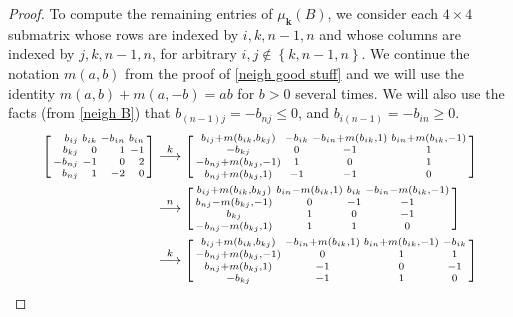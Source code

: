 \documentclass{amsart}
\theoremstyle{definition}
\theoremstyle{remark}
\numberwithin{equation}{section}
\newcommand{\sgn}{\operatorname{sgn}}
\newcommand{\set}[1]{{\left\lbrace #1 \right\rbrace}}
\newcommand{\0}{{\mathbf{0}}}
\newcommand{\kk}{\mathbf{k}}
\begin{document}
\begin{proof}
To compute the remaining entries of $\mu_\kk(B)$, we consider each $4\times4$ submatrix whose rows are indexed by $i,k,n-1,n$ and whose columns are indexed by $j,k,n-1,n$, for arbitrary $i,j\not\in\set{k,n-1,n}$.
We continue the notation $m(a,b)$ from the proof of \cref{neigh good stuff} and we will use the identity $m(a,b)+m(a,-b)=ab$ for $b>0$ several times.
We will also use the facts (from \cref{neigh B}) that $b_{(n-1)j}=-b_{nj}\le0$, and $b_{i(n-1)}=-b_{in}\ge0$.
\begin{align*}
\begin{bsmallmatrix*}[r]
b_{ij}&b_{ik}&-b_{in}&b_{in}\\
b_{kj}&0&1&-1\\
-b_{nj}&-1&0&2\\
b_{nj}&1&-2&0
\end{bsmallmatrix*}
&\overset{k}{\longrightarrow}
\begin{bsmallmatrix*}
b_{ij}+m(b_{ik},b_{kj}) & -b_{ik} & -b_{in}+m(b_{ik},1) & b_{in}+m(b_{ik},-1)\\
-b_{kj} & 0 & -1 & 1\\
-b_{nj}+m(b_{kj},-1) & 1 & 0 & 1\\
b_{nj}+m(b_{kj},1) & -1 & -1 & 0
\end{bsmallmatrix*}\\
&\overset{n}{\longrightarrow}
\begin{bsmallmatrix*}
b_{ij}+m(b_{ik},b_{kj}) & b_{in}-m(b_{ik},1) & b_{ik} & -b_{in}-m(b_{ik},-1)\\
b_{nj}-m(b_{kj},-1) & 0 & -1 & -1\\
b_{kj} & 1 & 0 & -1\\
-b_{nj}-m(b_{kj},1) & 1 & 1 & 0
\end{bsmallmatrix*}\\
&\overset{k}{\longrightarrow}
\begin{bsmallmatrix*}
b_{ij}+m(b_{ik},b_{kj}) & -b_{in}+m(b_{ik},1) & b_{in}+m(b_{ik},-1) & -b_{ik}\\
-b_{nj}+m(b_{kj},-1) & 0 & 1 & 1\\
b_{nj}+m(b_{kj},1)  & -1 & 0 & -1\\
-b_{kj}& -1 & 1 & 0
\end{bsmallmatrix*}\\

\end{align*}
\end{proof}
\end{document}
